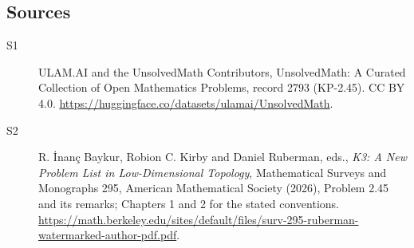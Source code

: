 \documentclass[11pt]{article}
\begin{document}
\subsection{Sources}
\begin{description}
\item[\hypertarget{source:2793:1}{S1}] ULAM.AI and the UnsolvedMath Contributors, UnsolvedMath: A Curated Collection of Open Mathematics Problems, record 2793 (KP-2.45). CC BY 4.0. \url{https://huggingface.co/datasets/ulamai/UnsolvedMath}.
\item[\hypertarget{source:2793:2}{S2}] R. İnanç Baykur, Robion C. Kirby and Daniel Ruberman, eds., \emph{K3: A New Problem List in Low-Dimensional Topology}, Mathematical Surveys and Monographs 295, American Mathematical Society (2026), Problem 2.45 and its remarks; Chapters 1 and 2 for the stated conventions. \url{https://math.berkeley.edu/sites/default/files/surv-295-ruberman-watermarked-author-pdf.pdf}.
\end{description}
\label{end:2793}
\end{document}

